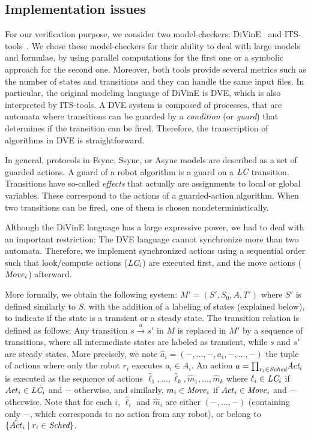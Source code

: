  		\subsection{Implementation issues} 
		\label{sec:mod:divine} 
For our verification purpose, we consider two model-checkers:
DiVinE~\cite{Divine13} and ITS-tools~\cite{LIP69510}. We
chose these model-checkers for their ability to deal with large models
and formulae, by using parallel computations for the first one or a
symbolic approach for the second one. Moreover, both tools provide
several metrics such as the number of states and transitions and they
can handle the same input files.  In particular, the original modeling
language of DiVinE is DVE, which is also interpreted by ITS-tools.  A
DVE system is composed of processes, that are automata where
transitions can be guarded by a \emph{condition} (or \emph{guard})
that determines if the transition can be fired. Therefore, the
transcription of algorithms in DVE is straightforward.

In general, protocols in Fsync, Ssync, or Async models are described
as a set of guarded actions. 
A guard of a robot algorithm is a guard on a $\textit{LC}$ transition.
Transitions have so-called \emph{effects} that actually are
assignments to local or global variables. These correspond to the
actions of a guarded-action algorithm. When two transitions can be
fired, one of them is chosen nondeterministically.

\smallskip Although the DiVinE language has a large expressive power,
we had to deal with an important restriction: The DVE language cannot
synchronize more than two automata. Therefore, we implement
synchronized actions using a sequential order such that look/compute
actions ($\textit{LC}_i$) are executed first, and the move actions
($\mathit{Move}_i $) afterward.

More formally, we obtain the following system: $M' =(S', S_0, A, T')$
where $S'$ is defined similarly to $S$, with the addition of a
labeling of states (explained below), to indicate if the state is a
transient or a steady state.  The transition relation is defined as
follows: Any transition $s \xrightarrow{a} s'$ in $M$ is replaced in
$M'$ by a sequence of transitions, where all intermediate states are
labeled as transient, while $s$ and $s'$ are steady states. More
precisely, we note $\hat{a}_i=(-, \ldots, -, a_i, -,\ldots, -)$ the
tuple of actions where only the robot $r_i$ executes $a_i \in A_i$.
An action $a={\prod_{r_i \in \textit{Sched}}} \textit{Act}_i$ is
executed as the sequence of actions $\hat{\ell}_1, \ldots,
\hat{\ell}_k, \hat{m}_1, \ldots, \hat{m}_k$ where $\ell_i \in
\textit{LC}_i$ if $Act_i \in \textit{LC}_i$ and $-$ otherwise, and
similarly, $m_i \in \mathit{Move}_i$ if $Act_i \in \mathit{Move}_i$
and $-$ otherwise. Note that for each $i$, $\hat{\ell}_i$ and
$\hat{m}_i$ are either $(-, \ldots,-)$ (containing only $-$, which
corresponds to no action from any robot), or belong to $\{\hat{Act}_i
\mid r_i \in \textit{Sched} \}$.

